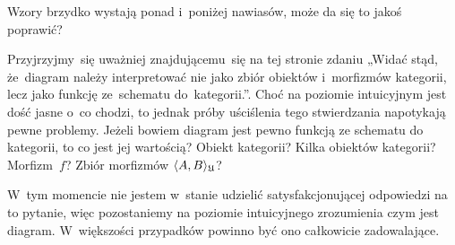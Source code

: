 \documentclass[a4paper,11pt]{article}
\begin{document}

\vspace{\spaceTwo}











\vspace{0em}




\noindent
{} Wzory brzydko wystają ponad i~poniżej nawiasów,
może da się to jakoś poprawić?

\vspace{\spaceFour}





\noindent
{}

\vspace{\spaceFour}





\noindent
{} Przyjrzyjmy~się uważniej znajdującemu~się na tej stronie zdaniu
„Widać stąd, że~diagram należy interpretować nie jako zbiór obiektów
i~morfizmów kategorii, lecz jako funkcję ze~schematu do~kategorii.”. Choć na
poziomie intuicyjnym jest dość jasne o~co chodzi, to jednak próby uściślenia
tego stwierdzania napotykają pewne problemy. Jeżeli bowiem diagram jest
pewno funkcją ze schematu do kategorii, to co jest jej wartością? Obiekt
kategorii? Kilka obiektów kategorii? Morfizm~$f$? Zbiór morfizmów
$\langle A, B \rangle_{ \mathfrak{U} }$?

W~tym momencie nie jestem w~stanie udzielić satysfakcjonującej odpowiedzi na
to pytanie, więc pozostaniemy na poziomie intuicyjnego zrozumienia czym jest
diagram. W~większości przypadków powinno być ono całkowicie zadowalające.
\end{document}
